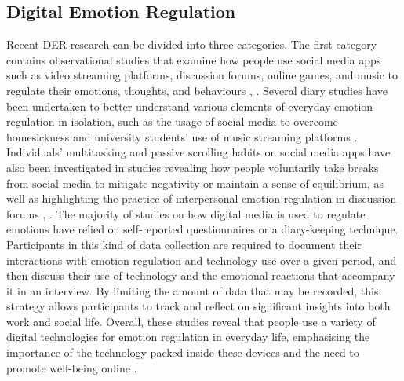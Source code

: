 \documentclass[acmtog]{acmart}
\begin{document}
\subsection{Digital Emotion Regulation}
Recent DER research can be divided into three categories. The first category contains observational studies that examine how people use social media apps such as video streaming platforms, discussion forums, online games, and music to regulate their emotions, thoughts, and behaviours \cite{smith2022digital}, \cite{shen2020video}. Several diary studies have been undertaken to better understand various elements of everyday emotion regulation in isolation, such as the usage of social media to overcome homesickness and university students' use of music streaming platforms \cite{wadley2019use}. Individuals' multitasking and passive scrolling habits on social media apps have also been investigated in studies revealing how people voluntarily take breaks from social media to mitigate negativity or maintain a sense of equilibrium, as well as highlighting the practice of interpersonal emotion regulation in discussion forums \cite{hossain2022motivational}, \cite{lukoff2018makes}. The majority of studies on how digital media is used to regulate emotions have relied on self-reported questionnaires or a diary-keeping technique. Participants in this kind of data collection are required to document their interactions with emotion regulation and technology use over a given period, and then discuss their use of technology and the emotional reactions that accompany it in an interview. By limiting the amount of data that may be recorded, this strategy allows participants to track and reflect on significant insights into both work and social life. Overall, these studies reveal that people use a variety of digital technologies for emotion regulation in everyday life, emphasising the importance of the technology packed inside these devices and the need to promote well-being online \cite{wadley2020digital}.
\end{document}
